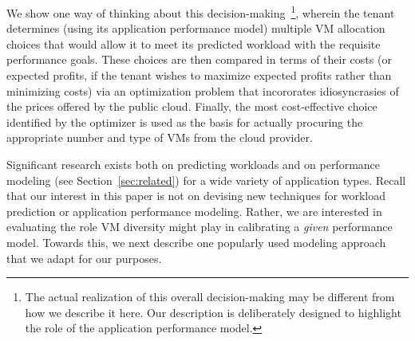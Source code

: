 We show one way of thinking about this decision-making~\footnote{The actual realization of this overall decision-making may be different from how we describe it here. Our description is deliberately designed to highlight the role of the application performance model.}, wherein the tenant determines (using its application performance model) multiple VM allocation choices that would allow it to meet its predicted workload with the requisite performance goals. These choices are then compared in terms of their costs (or expected profits, if the tenant wishes to maximize expected profits rather than minimizing costs) via an optimization problem that incororates idiosyncrasies of the prices offered by the public cloud. Finally, the most cost-effective choice identified by the optimizer is used as the basis for actually procuring the appropriate number and type of VMs from the cloud provider. 

Significant research exists both on predicting workloads and on performance modeling (see Section~\ref{sec:related}) for a wide variety of application types. Recall that our interest in this paper is not on devising new techniques for workload prediction or application performance modeling. Rather, we are interested in evaluating the role VM diversity might play in calibrating a {\it given} performance model. Towards this, we next describe one popularly used modeling approach that we adapt for our purposes. 

